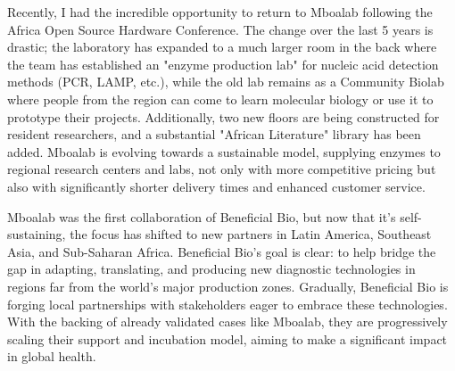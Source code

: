  Recently, I had the incredible opportunity to return to Mboalab following the Africa Open Source Hardware Conference. The change over the last 5 years is drastic; the laboratory 
 has expanded to a much larger room in the back where the team has established an "enzyme production lab" for nucleic acid detection methods (PCR, LAMP, etc.), while the old lab
  remains as a Community Biolab where people from the region can come to learn molecular biology or use it to prototype their projects. Additionally, two new floors are being 
  constructed for resident researchers, and a substantial "African Literature" library has been added. Mboalab is evolving towards a sustainable model, supplying enzymes to 
  regional research centers and labs, not only with more competitive pricing but also with significantly shorter delivery times and enhanced customer service.

Mboalab was the first collaboration of Beneficial Bio, but now that it's self-sustaining, the focus has shifted to new partners in Latin America, Southeast Asia, and Sub-Saharan Africa. 
Beneficial Bio's goal is clear: to help bridge the gap in adapting, translating, and producing new diagnostic technologies in regions far from the world's major production 
zones. Gradually, Beneficial Bio is forging local partnerships with stakeholders eager to embrace these technologies. With the backing of already validated cases like Mboalab,
 they are progressively scaling their support and incubation model, aiming to make a significant impact in global health.
